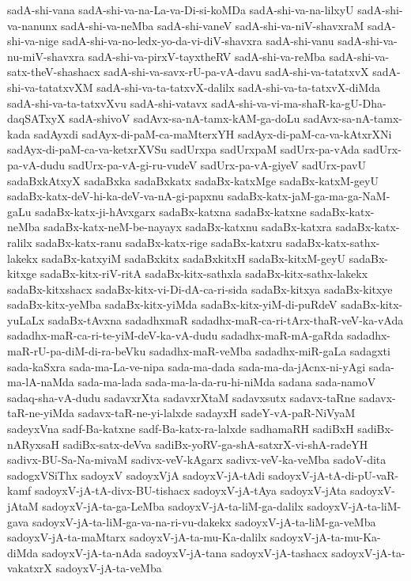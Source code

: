 {sadA-shi-vana
sadA-shi-va-na-La-va-Di-si-koMDa
sadA-shi-va-na-lilxyU
sadA-shi-va-nanunx
sadA-shi-va-neMba
sadA-shi-vaneV
sadA-shi-va-niV-shavxraM
sadA-shi-va-nige
sadA-shi-va-no-ledx-yo-da-vi-diV-shavxra
sadA-shi-vanu
sadA-shi-va-nu-miV-shavxra
sadA-shi-va-pirxV-tayxtheRV
sadA-shi-va-reMba
sadA-shi-va-satx-theV-shashacx
sadA-shi-va-savx-rU-pa-vA-davu
sadA-shi-va-tatatxvX
sadA-shi-va-tatatxvXM
sadA-shi-va-ta-tatxvX-dalilx
sadA-shi-va-ta-tatxvX-diMda
sadA-shi-va-ta-tatxvXvu
sadA-shi-vatavx
sadA-shi-va-vi-ma-shaR-ka-gU-Dha-daqSATxyX
sadA-shivoV
sadAvx-sa-nA-tamx-kAM-ga-doLu
sadAvx-sa-nA-tamx-kada
sadAyxdi
sadAyx-di-paM-ca-maMterxYH
sadAyx-di-paM-ca-va-kAtxrXNi
sadAyx-di-paM-ca-va-ketxrXVSu
sadUrxpa
sadUrxpaM
sadUrx-pa-vAda
sadUrx-pa-vA-dudu
sadUrx-pa-vA-gi-ru-vudeV
sadUrx-pa-vA-giyeV
sadUrx-pavU
sadaBxkAtxyX
sadaBxka
sadaBxkatx
sadaBx-katxMge
sadaBx-katxM-geyU
sadaBx-katx-deV-hi-ka-deV-va-nA-gi-papxnu
sadaBx-katx-jaM-ga-ma-ga-NaM-gaLu
sadaBx-katx-ji-hAvxgarx
sadaBx-katxna
sadaBx-katxne
sadaBx-katx-neMba
sadaBx-katx-neM-be-nayayx
sadaBx-katxnu
sadaBx-katxra
sadaBx-katx-ralilx
sadaBx-katx-ranu
sadaBx-katx-rige
sadaBx-katxru
sadaBx-katx-sathx-lakekx
sadaBx-katxyiM
sadaBxkitx
sadaBxkitxH
sadaBx-kitxM-geyU
sadaBx-kitxge
sadaBx-kitx-riV-ritA
sadaBx-kitx-sathxla
sadaBx-kitx-sathx-lakekx
sadaBx-kitxshacx
sadaBx-kitx-vi-Di-dA-ca-ri-sida
sadaBx-kitxya
sadaBx-kitxye
sadaBx-kitx-yeMba
sadaBx-kitx-yiMda
sadaBx-kitx-yiM-di-puRdeV
sadaBx-kitx-yuLaLx
sadaBx-tAvxna
sadadhxmaR
sadadhx-maR-ca-ri-tArx-thaR-veV-ka-vAda
sadadhx-maR-ca-ri-te-yiM-deV-ka-vA-dudu
sadadhx-maR-mA-gaRda
sadadhx-maR-rU-pa-diM-di-ra-beVku
sadadhx-maR-veMba
sadadhx-miR-gaLa
sadagxti
sada-kaSxra
sada-ma-La-ve-nipa
sada-ma-dada
sada-ma-da-jAcnx-ni-yAgi
sada-ma-lA-naMda
sada-ma-lada
sada-ma-la-da-ru-hi-niMda
sadana
sada-namoV
sadaq-sha-vA-dudu
sadavxrXta
sadavxrXtaM
sadavxsutx
sadavx-taRne
sadavx-taR-ne-yiMda
sadavx-taR-ne-yi-lalxde
sadayxH
sadeY-vA-paR-NiVyaM
sadeyxVna
sadf-Ba-katxne
sadf-Ba-katx-ra-lalxde
sadhamaRH
sadiBxH
sadiBx-nARyxsaH
sadiBx-satx-deVva
sadiBx-yoRV-ga-shA-satxrX-vi-shA-radeYH
sadivx-BU-Sa-Na-mivaM
sadivx-veV-kAgarx
sadivx-veV-ka-veMba
sadoV-dita
sadogxVSiThx
sadoyxV
sadoyxVjA
sadoyxV-jA-tAdi
sadoyxV-jA-tA-di-pU-vaR-kamf
sadoyxV-jA-tA-divx-BU-tishacx
sadoyxV-jA-tAya
sadoyxV-jAta
sadoyxV-jAtaM
sadoyxV-jA-ta-ga-LeMba
sadoyxV-jA-ta-liM-ga-dalilx
sadoyxV-jA-ta-liM-gava
sadoyxV-jA-ta-liM-ga-va-na-ri-vu-dakekx
sadoyxV-jA-ta-liM-ga-veMba
sadoyxV-jA-ta-maMtarx
sadoyxV-jA-ta-mu-Ka-dalilx
sadoyxV-jA-ta-mu-Ka-diMda
sadoyxV-jA-ta-nAda
sadoyxV-jA-tana
sadoyxV-jA-tashacx
sadoyxV-jA-ta-vakatxrX
sadoyxV-jA-ta-veMba
}
